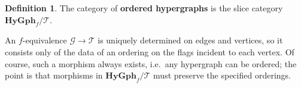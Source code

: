 \documentclass{article}
\newtheorem{lem}[thm]{Lemma}
\newtheorem{cor}[thm]{Corollary}
\theoremstyle{definition}
\newtheorem{defn}[thm]{Definition}
\theoremstyle{remark}
\def\G{\mathcal{G}}
\let\setof\Set
\def\Set{\mathbf{Set}}
\newcounter{nodemaker}
\newcommand{\twocell}[2][]{%
  \global\edef\mynodeone{twocell\arabic{nodemaker}}%
  \stepcounter{nodemaker}%
  \global\edef\mynodetwo{twocell\arabic{nodemaker}}%
  \stepcounter{nodemaker}%
  \ar[#2,phantom,shift left=3,""{name=\mynodeone}]%
  \ar[#2,phantom,shift right=3,""'{name=\mynodetwo}]%
  \ar[Rightarrow,from=\mynodeone,to=\mynodetwo,"{#1}"]%
}
\let\ot\leftarrow
\let\xto\xrightarrow
\def\N{\mathbb{N}}
\def\Np{\N_{\bullet}}
\def\hy{\mathbf{HyGph}}
\def\RGph{\mathbf{RGph}}
\def\thy{\mathcal{T}}
\begin{document}
\begin{defn}
  The category of \textbf{ordered hypergraphs} is the slice category $\hy_f/\thy$.
\end{defn}

An $f$-equivalence $\G\to\thy$ is uniquely determined on edges and vertices, so it consists only of the data of an ordering on the flags incident to each vertex.
Of course, such a morphism always exists, i.e.\ any hypergraph can be ordered; the point is that morphisms in $\hy_f/\thy$ must preserve the specified orderings.

\begin{comment}
Ordered hypergraphs have another convenient description.
Let $\Np$ be the set $\setof{(k,n) \in \N\times \N | k<n}$, with $\ell:\Np\to \N$ the second projection.
Thus the fiber of $\ell$ over $n\in\N$ is the canonical $n$-element linear order, and we can write $\thy = (\N \ot \Np \to 1)$.

Let $P_\ell$ be the polynomial endofunctor of $\Set$ defined by $\ell$, i.e.\ the composite
\[ \Set \xto{(\Np)^*} \Set/\Np \xto{\Pi_\ell} \Set/\N \xto{\Sigma_\N} \Set.\]
Thus an element of $P_\ell(E)$ is a finite list of elements of $E$.

Let $\RGph$ denote the category of reflexive directed graphs, with $U:\RGph\to\Set$ the functor taking the underlying set of vertices.

\begin{lem}
  The category $\hy/\thy$ of ordered hypergraphs is equivalent to the comma category
  \[
  \begin{tikzcd}
    \hy \ar[rr] \ar[d] \twocell{drr} && \Set \ar[d,equals] \\
    \RGph \ar[r,"U"'] & \Set \ar[r,"P_\ell"'] & \Set.
  \end{tikzcd}
  \]
\end{lem}
\begin{proof}
  An object of the comma category consists of a reflexive graph $E$ together with a set $V$ and a map $V \to P_\ell U E$.
  By definition of $P_\ell$, the latter map is equivalent to a map $f:V\to \N$ together with a map $f^*\Np \to UE$.
  This is exactly the data of a hypergraph $V \ot f^*\Np \to E$ equipped with a hypergraph map to $\thy = (\N \ot\Np \to 1)$.
\end{proof}

\begin{cor}
  $\hy/\thy$ is a presheaf topos.
  In particular, it is complete and cocomplete.
\end{cor}
\begin{proof}
  The functor $P_\ell \circ U : \RGph \to \Set$ is a parametric right adjoint, since $P_\ell$ is a polynomial functor and $U$ is a right adjoint.
  Thus, since $\RGph$ is a presheaf topos, by~\cite{cj:clfrag} $\hy/\thy$ is again a presheaf topos.
\end{proof}
\end{comment}
\end{document}
